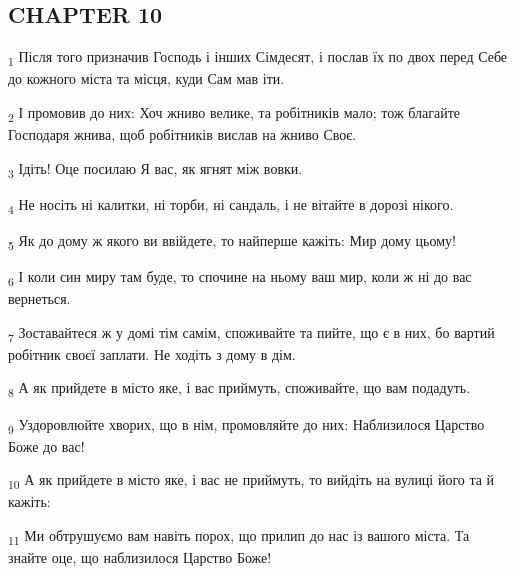 \subsection{CHAPTER 10}
\begin{tcolorbox}
\textsubscript{1} Після того призначив Господь і інших Сімдесят, і послав їх по двох перед Себе до кожного міста та місця, куди Сам мав іти.
\end{tcolorbox}
\begin{tcolorbox}
\textsubscript{2} І промовив до них: Хоч жниво велике, та робітників мало; тож благайте Господаря жнива, щоб робітників вислав на жниво Своє.
\end{tcolorbox}
\begin{tcolorbox}
\textsubscript{3} Ідіть! Оце посилаю Я вас, як ягнят між вовки.
\end{tcolorbox}
\begin{tcolorbox}
\textsubscript{4} Не носіть ні калитки, ні торби, ні сандаль, і не вітайте в дорозі нікого.
\end{tcolorbox}
\begin{tcolorbox}
\textsubscript{5} Як до дому ж якого ви ввійдете, то найперше кажіть: Мир дому цьому!
\end{tcolorbox}
\begin{tcolorbox}
\textsubscript{6} І коли син миру там буде, то спочине на ньому ваш мир, коли ж ні до вас вернеться.
\end{tcolorbox}
\begin{tcolorbox}
\textsubscript{7} Зоставайтеся ж у домі тім самім, споживайте та пийте, що є в них, бо вартий робітник своєї заплати. Не ходіть з дому в дім.
\end{tcolorbox}
\begin{tcolorbox}
\textsubscript{8} А як прийдете в місто яке, і вас приймуть, споживайте, що вам подадуть.
\end{tcolorbox}
\begin{tcolorbox}
\textsubscript{9} Уздоровлюйте хворих, що в нім, промовляйте до них: Наблизилося Царство Боже до вас!
\end{tcolorbox}
\begin{tcolorbox}
\textsubscript{10} А як прийдете в місто яке, і вас не приймуть, то вийдіть на вулиці його та й кажіть:
\end{tcolorbox}
\begin{tcolorbox}
\textsubscript{11} Ми обтрушуємо вам навіть порох, що прилип до нас із вашого міста. Та знайте оце, що наблизилося Царство Боже!
\end{tcolorbox}
